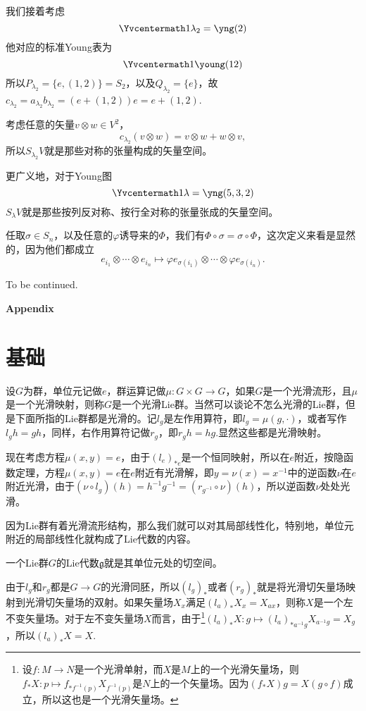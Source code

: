 \documentclass[9pt]{extarticle}
\newcommand{\lag}{{\mathfrak{g}}}
\begin{document}
我们接着考虑
\[\Yvcentermath1
	\lambda_2=\yng(2)
\]
他对应的标准Young表为
\[\Yvcentermath1
	\young(12)
\]
所以$P_{\lambda_2}=\{e,(1,2)\}=S_2$，以及$Q_{\lambda_2}=\{e\}$，故$c_{\lambda_2}=a_{\lambda_2} b_{\lambda_2} =(e+(1,2))e =e+(1,2)$.

考虑任意的矢量$v\otimes w\in V^2$，
\[
c_{\lambda_2}(v\otimes w)=v\otimes w+w\otimes v,
\]
所以$S_{\lambda_2} V$就是那些对称的张量构成的矢量空间。

更广义地，对于Young图
\[\Yvcentermath1
	\lambda=\yng(5,3,2)
\]
$S_{\lambda} V$就是那些按列反对称、按行全对称的张量张成的矢量空间。

\para 任取$\sigma\in S_n$，以及任意的$\varphi$诱导来的$\Phi$，我们有$\Phi\circ \sigma=\sigma\circ \Phi$，这次定义来看是显然的，因为他们都成立
\[
	e_{i_1}\otimes\cdots\otimes e_{i_n}\mapsto \varphi e_{\sigma(i_1)}\otimes\cdots\otimes \varphi e_{\sigma(i_n)}.
\]

To be continued.

\clearpage
\appendix
\noindent \textbf{\huge Appendix}

\renewcommand{\thepara}{\Alph{section}.\arabic{para}}

\section{基础}

\para 设$G$为群，单位元记做$e$，群运算记做$\mu:G\times G\to G$，如果$G$是一个光滑流形，且$\mu$是一个光滑映射，则称$G$是一个光滑Lie群。当然可以谈论不怎么光滑的Lie群，但是下面所指的Lie群都是光滑的。记$l_g$是左作用算符，即$l_g=\mu(g,\cdot)$，或者写作$l_gh=gh$，同样，右作用算符记做$r_g$，即$r_gh=hg$.显然这些都是光滑映射。

现在考虑方程$\mu(x,y)=e$，由于$(l_e)_{*e}$是一个恒同映射，所以在$e$附近，按隐函数定理，方程$\mu(x,y)=e$在$e$附近有光滑解，即$y=\nu(x)=x^{-1}$中的逆函数$\nu$在$e$附近光滑，由于$(\nu\circ l_g)(h)=h^{-1}g^{-1}=(r_{g^{-1}}\circ \nu)(h)$，所以逆函数$\nu$处处光滑。

因为Lie群有着光滑流形结构，那么我们就可以对其局部线性化，特别地，单位元附近的局部线性化就构成了Lie代数的内容。

\para 一个Lie群$G$的Lie代数$\lag$就是其单位元处的切空间。

由于$l_g$和$r_g$都是$G\to G$的光滑同胚，所以$(l_g)_*$或者$(r_g)_*$就是将光滑切矢量场映射到光滑切矢量场的双射。如果矢量场$X_x$满足$(l_a)_*X_x=X_{ax}$，则称$X$是一个左不变矢量场。对于左不变矢量场$X$而言，由于\footnote{设$f:M\to N$是一个光滑单射，而$X$是$M$上的一个光滑矢量场，则$f_*X:p\mapsto f_{*f^{-1}(p)}X_{f^{-1}(p)}$是$N$上的一个矢量场。因为$(f_*X)g=X(g\circ f)$成立，所以这也是一个光滑矢量场。}$(l_a)_*X:g\mapsto (l_a)_{*a^{-1}g}X_{a^{-1}g}=X_g$，所以$(l_a)_*X=X$.
\end{document}
